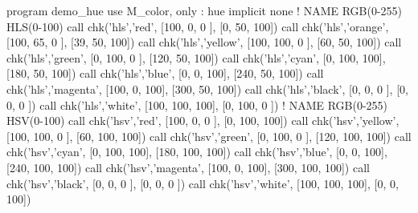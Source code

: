 \begin{DoxyDescription}
\begin{DoxyPre}    program demo\_hue
    use M\_color, only : hue
    implicit none
       !               NAME        RGB(0-255)            HLS(0-100)
       call chk('hls','red',     [100, 0,   0  ], [0,   50,  100])
       call chk('hls','orange',  [100, 65,  0  ], [39,  50,  100])
       call chk('hls','yellow',  [100, 100, 0  ], [60,  50,  100])
       call chk('hls','green',   [0,   100, 0  ], [120, 50,  100])
       call chk('hls','cyan',    [0,   100, 100], [180, 50,  100])
       call chk('hls','blue',    [0,   0,   100], [240, 50,  100])
       call chk('hls','magenta', [100, 0,   100], [300, 50,  100])
       call chk('hls','black',   [0,   0,   0  ], [0,   0,   0  ])
       call chk('hls','white',   [100, 100, 100], [0,   100, 0  ])
       !               NAME        RGB(0-255)           HSV(0-100)
       call chk('hsv','red',     [100, 0,   0  ], [0,   100, 100])
       call chk('hsv','yellow',  [100, 100, 0  ], [60,  100, 100])
       call chk('hsv','green',   [0,   100, 0  ], [120, 100, 100])
       call chk('hsv','cyan',    [0,   100, 100], [180, 100, 100])
       call chk('hsv','blue',    [0,   0,   100], [240, 100, 100])
       call chk('hsv','magenta', [100, 0,   100], [300, 100, 100])
       call chk('hsv','black',   [0,   0,   0  ], [0,   0,   0  ])
       call chk('hsv','white',   [100, 100, 100], [0,   0,   100])\end{DoxyPre}




\end{DoxyDescription}
